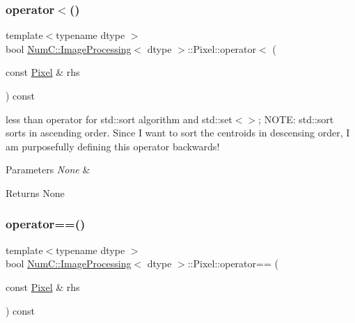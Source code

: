 \subsubsection{\texorpdfstring{operator$<$()}{operator<()}}
{\footnotesize\ttfamily template$<$typename dtype $>$ \\
bool \mbox{\hyperlink{class_num_c_1_1_image_processing}{Num\+C\+::\+Image\+Processing}}$<$ dtype $>$\+::Pixel\+::operator$<$ (\begin{DoxyParamCaption}\item[{const \mbox{\hyperlink{class_num_c_1_1_image_processing_1_1_pixel}{Pixel}} \&}]{rhs }\end{DoxyParamCaption}) const\hspace{0.3cm}{\ttfamily [inline]}}

less than operator for std\+::sort algorithm and std\+::set$<$$>$; N\+O\+TE\+: std\+::sort sorts in ascending order. Since I want to sort the centroids in descensing order, I am purposefully defining this operator backwards!


\begin{DoxyParams}{Parameters}
{\em None} & \\
\hline
\end{DoxyParams}
\begin{DoxyReturn}{Returns}
None 
\end{DoxyReturn}
\mbox{\label{class_num_c_1_1_image_processing_1_1_pixel_ab99d24ca953870794f9d0e2d35a49679}} 
\subsubsection{\texorpdfstring{operator==()}{operator==()}}
{\footnotesize\ttfamily template$<$typename dtype $>$ \\
bool \mbox{\hyperlink{class_num_c_1_1_image_processing}{Num\+C\+::\+Image\+Processing}}$<$ dtype $>$\+::Pixel\+::operator== (\begin{DoxyParamCaption}\item[{const \mbox{\hyperlink{class_num_c_1_1_image_processing_1_1_pixel}{Pixel}} \&}]{rhs }\end{DoxyParamCaption}) const\hspace{0.3cm}{\ttfamily [inline]}}

